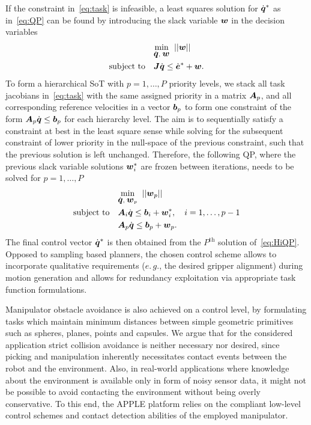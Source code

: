 If the constraint in~\eqref{eq:task} is infeasible, a least squares solution for $\dot{\mbox{\boldmath $q$}}^*$ as
in~\eqref{eq:QP} can be found by introducing the slack variable $\mbox{\boldmath $w$}$ in the decision variables
%
\begin{align}\label{eq:iQP}
  &\underset{\dot{\mbox{\boldmath $q$}},\;\mbox{\boldmath $w$}}{\mbox{min}}\;\;||\mbox{\boldmath $w$}||\\
   \mbox{subject to} \quad &\mbox{\boldmath $J$}\dot{\mbox{\boldmath $q$}} \leq \dot{\mbox{\boldmath $e$}}^* + \mbox{\boldmath $w$}. \nonumber
\end{align}
%
To form a hierarchical SoT with $p=1,\dots,P$ priority levels, we stack all task jacobians
in~\eqref{eq:task} with the same assigned priority in a matrix $\mbox{\boldmath $A$}_p$, and all corresponding
reference velocities in a vector $\mbox{\boldmath $b$}_p$ to form one constraint of the form
$\mbox{\boldmath $A$}_p\dot{\mbox{\boldmath $q$}}\leq \mbox{\boldmath $b$}_p$ for each hierarchy level. The aim is to sequentially satisfy
a constraint at best in the least square sense while solving for the subsequent constraint of lower
priority in the null-space of the previous constraint, such that the previous solution is left
unchanged. Therefore, the following QP, where the previous slack variable solutions $\mbox{\boldmath $w$}_i^*$
are frozen between iterations, needs to be solved for $p=1,\ldots,P$
%
\begin{align}\label{eq:HiQP}
  &\underset{\dot{\mbox{\boldmath $q$}},\;\mbox{\boldmath $w$}_p}{\mbox{min}}\;\;||\mbox{\boldmath $w$}_p||\\
   \mbox{subject to} \quad &\mbox{\boldmath $A$}_i\dot{\mbox{\boldmath $q$}} \leq \mbox{\boldmath $b$}_i + \mbox{\boldmath $w$}_i^*, \quad i=1,\dots,p-1 \nonumber \\
                           &\mbox{\boldmath $A$}_p\dot{\mbox{\boldmath $q$}} \leq \mbox{\boldmath $b$}_p + \mbox{\boldmath $w$}_p.  \nonumber 
\end{align}
%
The final control vector $\dot{\mbox{\boldmath $q$}}^*$ is then obtained from the $P^{\mbox{th}}$ solution
of~\eqref{eq:HiQP}. Opposed to sampling based planners, the chosen control scheme allows to
incorporate qualitative requirements ($e.\,g.$, the desired gripper alignment) during motion
generation and allows for redundancy exploitation via appropriate task function formulations.

Manipulator obstacle avoidance is also achieved on a control level, by formulating tasks which
maintain minimum distances between simple geometric primitives such as spheres, planes, points and
capsules. We argue that for the considered application strict collision avoidance is neither
necessary nor desired, since picking and manipulation inherently necessitates contact events between
the robot and the environment. Also, in real-world applications where knowledge about the
environment is available only in form of noisy sensor data, it might not be possible to avoid
contacting the environment without being overly conservative. To this end, the APPLE platform relies
on the compliant low-level control schemes and contact detection abilities of the employed
manipulator.
%
